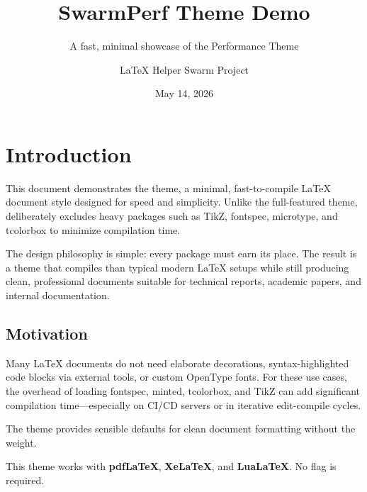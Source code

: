 \documentclass[11pt, a4paper]{article}
\title{SwarmPerf Theme Demo}
\subtitle{A fast, minimal showcase of the Performance Theme}
\author{LaTeX Helper Swarm Project}
\date{May 14, 2026}
\begin{document}

\swarmtitlepage


\tableofcontents
\newpage


\section{Introduction}

This document demonstrates the  theme, a minimal, fast-to-compile
LaTeX document style designed for speed and simplicity. Unlike the full-featured
 theme,  deliberately excludes heavy packages
such as TikZ, fontspec, microtype, and tcolorbox to minimize compilation time.

The design philosophy is simple: every package must earn its place. The result is
a theme that compiles  than typical modern LaTeX setups while
still producing clean, professional documents suitable for technical reports,
academic papers, and internal documentation.

\subsection{Motivation}

Many LaTeX documents do not need elaborate decorations, syntax-highlighted code
blocks via external tools, or custom OpenType fonts. For these use cases, the
overhead of loading fontspec, minted, tcolorbox, and TikZ can add significant
compilation time---especially on CI/CD servers or in iterative edit-compile cycles.

The  theme provides sensible defaults for clean document
formatting without the weight.

\begin{noteblock}
This theme works with \textbf{pdfLaTeX}, \textbf{XeLaTeX}, and
\textbf{LuaLaTeX}. No  flag is required.
\end{noteblock}
\end{document}
